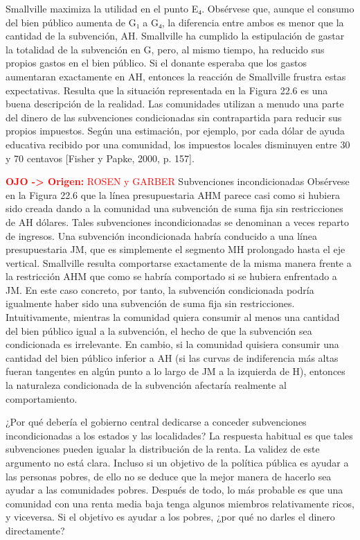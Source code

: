 \documentclass[10pt,a4paper]{article}
\begin{document}
Smallville maximiza la utilidad en el punto E₄. Obsérvese que, aunque el consumo del bien público aumenta de G₁ a G₄, la diferencia entre ambos es menor que la cantidad de la subvención, AH. Smallville ha cumplido la estipulación de gastar la totalidad de la subvención en G, pero, al mismo tiempo, ha reducido sus propios gastos en el bien público. Si el donante esperaba que los gastos aumentaran exactamente en AH, entonces la reacción de Smallville frustra estas expectativas. Resulta que la situación representada en la Figura 22.6 es una buena descripción de la realidad. Las comunidades utilizan a menudo una parte del dinero de las subvenciones condicionadas sin contrapartida para reducir sus propios impuestos. Según una estimación, por ejemplo, por cada dólar de ayuda educativa recibido por una comunidad, los impuestos locales disminuyen entre 30 y 70 centavos [Fisher y Papke, 2000, p. 157].

\textcolor{red}{\textbf{OJO -> Origen:} ROSEN y GARBER}
Subvenciones incondicionadas 
Obsérvese en la Figura 22.6 que la línea presupuestaria AHM parece casi como si hubiera sido creada dando a la comunidad una subvención de suma fija sin restricciones de AH dólares. Tales subvenciones incondicionadas se denominan a veces reparto de ingresos. Una subvención incondicionada habría conducido a una línea presupuestaria JM, que es simplemente el segmento MH prolongado hasta el eje vertical. Smallville resulta comportarse exactamente de la misma manera frente a la restricción AHM que como se habría comportado si se hubiera enfrentado a JM. En este caso concreto, por tanto, la subvención condicionada podría igualmente haber sido una subvención de suma fija sin restricciones. Intuitivamente, mientras la comunidad quiera consumir al menos una cantidad del bien público igual a la subvención, el hecho de que la subvención sea condicionada es irrelevante. En cambio, si la comunidad quisiera consumir una cantidad del bien público inferior a AH (si las curvas de indiferencia más altas fueran tangentes en algún punto a lo largo de JM a la izquierda de H), entonces la naturaleza condicionada de la subvención afectaría realmente al comportamiento.


¿Por qué debería el gobierno central dedicarse a conceder subvenciones incondicionadas a los estados y las localidades? La respuesta habitual es que tales subvenciones pueden igualar la distribución de la renta. La validez de este argumento no está clara. Incluso si un objetivo de la política pública es ayudar a las personas pobres, de ello no se deduce que la mejor manera de hacerlo sea ayudar a las comunidades pobres. Después de todo, lo más probable es que una comunidad con una renta media baja tenga algunos miembros relativamente ricos, y viceversa. Si el objetivo es ayudar a los pobres, ¿por qué no darles el dinero directamente?
\end{document}
